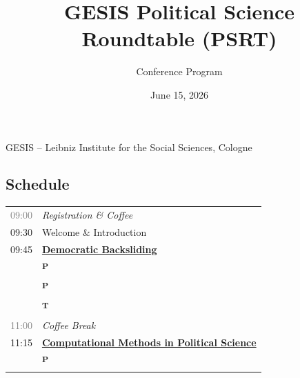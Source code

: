 \documentclass[
]{article}
\title{GESIS Political Science Roundtable (PSRT)}
\subtitle{Conference Program}
\author{}
\date{June 15, 2026}
\newcommand{\typeicon}[1]{%
  \textsuperscript{\sffamily\bfseries #1}%
}
\begin{document}
\maketitle


\begin{center}
{\small GESIS -- Leibniz Institute for the Social Sciences, Cologne}
\end{center}

\subsection{Schedule}\label{schedule}

\renewcommand{\arraystretch}{1.4}
\begin{tabularx}{\textwidth}{lX}

\textcolor{gray}{\textsf{09:00}} & \textit{Registration \& Coffee}\\
\textsf{09:30} & Welcome \& Introduction\\
\textsf{09:45} & \textbf{\hyperlink{democratic-backsliding}{Democratic Backsliding}}\\
 & \hspace{1.2em}\typeicon{P}\hspace{0.3em}{\small Jane Doe -- \hyperlink{jane-doe-material-interventions-and-legislative-performance}{Material Interventions and Legislative Performance}}\\
 & \hspace{1.2em}\typeicon{P}\hspace{0.3em}{\small John Smith -- \hyperlink{john-smith-persuasive-framing-and-institutional-menu-reform}{Persuasive Framing and Institutional Menu Reform}}\\
 & \hspace{1.2em}\typeicon{T}\hspace{0.3em}{\small Jane Johnson -- \hyperlink{jane-johnson-adaptive-strategies-under-environmental-disruption}{Adaptive Strategies Under Environmental Disruption}}\\
\textcolor{gray}{\textsf{11:00}} & \textit{Coffee Break}\\
\textsf{11:15} & \textbf{\hyperlink{computational-methods-in-political-science}{Computational Methods in Political Science}}\\
 & \hspace{1.2em}\typeicon{P}\hspace{0.3em}{\small John Doe -- \hyperlink{john-doe-transformer-models-for-cross-domain-breakfast-classification}{Transformer Models for Cross-Domain Breakfast Classification}}\\

\end{tabularx}
\end{document}
